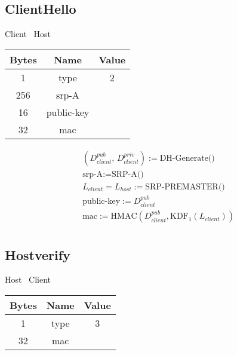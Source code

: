 \subsection{ClientHello}

\begin{center}
    Client \textrightarrow\ Host\\
    \begin{tabular}{|c|c|c|}
        \hline
        \textbf{Bytes} & \textbf{Name} & \textbf{Value} \\
        \hline
        1              & type          & 2              \\
        \hline
        256            & srp-A         &                \\
        \hline
        16             & public-key    &                \\
        \hline
        32             & mac           &                \\
        \hline
    \end{tabular}
\end{center}

\begin{align*}
    & (D_{client}^{pub},\, D_{client}^{priv}) := \text{DH-Generate()}\\
    & \text{srp-A} := \text{SRP-A()}\\
    & L_{client} = L_{host} := \text{SRP-PREMASTER()}\\
    & \text{public-key} := D_{client}^{pub}\\
    & \text{mac} := \text{HMAC}(D_{client}^{pub}, \text{KDF}_1(L_{client}))\\
\end{align*}

\subsection{Hostverify}

\begin{center}
    Host \textrightarrow\ Client\\
    \begin{tabular}{|c|c|c|}
        \hline
        \textbf{Bytes} & \textbf{Name} & \textbf{Value} \\
        \hline
        1              & type          & 3              \\
        \hline
        32             & mac           &                \\
        \hline
    \end{tabular}
\end{center}


